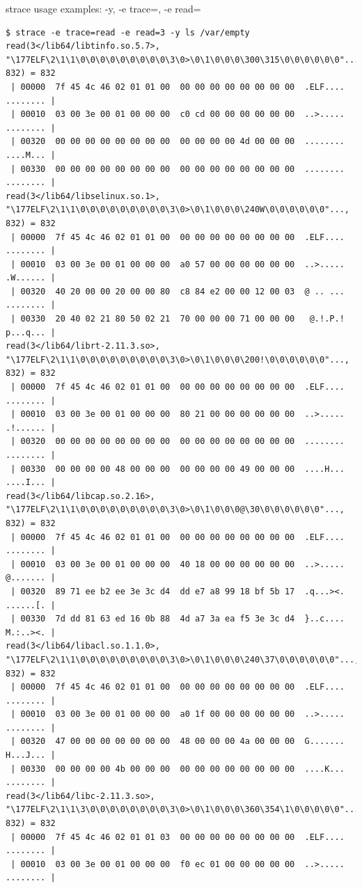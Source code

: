 \documentclass[unicode]{beamer}
\begin{document}
\begin{frame}[fragile]{strace usage examples: -y, -e trace=, -e read=}
\Tiny
\begin{verbatim}
$ strace -e trace=read -e read=3 -y ls /var/empty
read(3</lib64/libtinfo.so.5.7>, "\177ELF\2\1\1\0\0\0\0\0\0\0\0\0\3\0>\0\1\0\0\0\300\315\0\0\0\0\0\0"..., 832) = 832
 | 00000  7f 45 4c 46 02 01 01 00  00 00 00 00 00 00 00 00  .ELF.... ........ |
 | 00010  03 00 3e 00 01 00 00 00  c0 cd 00 00 00 00 00 00  ..>..... ........ |
 | 00320  00 00 00 00 00 00 00 00  00 00 00 00 4d 00 00 00  ........ ....M... |
 | 00330  00 00 00 00 00 00 00 00  00 00 00 00 00 00 00 00  ........ ........ |
read(3</lib64/libselinux.so.1>, "\177ELF\2\1\1\0\0\0\0\0\0\0\0\0\3\0>\0\1\0\0\0\240W\0\0\0\0\0\0"..., 832) = 832
 | 00000  7f 45 4c 46 02 01 01 00  00 00 00 00 00 00 00 00  .ELF.... ........ |
 | 00010  03 00 3e 00 01 00 00 00  a0 57 00 00 00 00 00 00  ..>..... .W...... |
 | 00320  40 20 00 00 20 00 00 80  c8 84 e2 00 00 12 00 03  @ .. ... ........ |
 | 00330  20 40 02 21 80 50 02 21  70 00 00 00 71 00 00 00   @.!.P.! p...q... |
read(3</lib64/librt-2.11.3.so>, "\177ELF\2\1\1\0\0\0\0\0\0\0\0\0\3\0>\0\1\0\0\0\200!\0\0\0\0\0\0"..., 832) = 832
 | 00000  7f 45 4c 46 02 01 01 00  00 00 00 00 00 00 00 00  .ELF.... ........ |
 | 00010  03 00 3e 00 01 00 00 00  80 21 00 00 00 00 00 00  ..>..... .!...... |
 | 00320  00 00 00 00 00 00 00 00  00 00 00 00 00 00 00 00  ........ ........ |
 | 00330  00 00 00 00 48 00 00 00  00 00 00 00 49 00 00 00  ....H... ....I... |
read(3</lib64/libcap.so.2.16>, "\177ELF\2\1\1\0\0\0\0\0\0\0\0\0\3\0>\0\1\0\0\0@\30\0\0\0\0\0\0"..., 832) = 832
 | 00000  7f 45 4c 46 02 01 01 00  00 00 00 00 00 00 00 00  .ELF.... ........ |
 | 00010  03 00 3e 00 01 00 00 00  40 18 00 00 00 00 00 00  ..>..... @....... |
 | 00320  89 71 ee b2 ee 3e 3c d4  dd e7 a8 99 18 bf 5b 17  .q...><. ......[. |
 | 00330  7d dd 81 63 ed 16 0b 88  4d a7 3a ea f5 3e 3c d4  }..c.... M.:..><. |
read(3</lib64/libacl.so.1.1.0>, "\177ELF\2\1\1\0\0\0\0\0\0\0\0\0\3\0>\0\1\0\0\0\240\37\0\0\0\0\0\0"..., 832) = 832
 | 00000  7f 45 4c 46 02 01 01 00  00 00 00 00 00 00 00 00  .ELF.... ........ |
 | 00010  03 00 3e 00 01 00 00 00  a0 1f 00 00 00 00 00 00  ..>..... ........ |
 | 00320  47 00 00 00 00 00 00 00  48 00 00 00 4a 00 00 00  G....... H...J... |
 | 00330  00 00 00 00 4b 00 00 00  00 00 00 00 00 00 00 00  ....K... ........ |
read(3</lib64/libc-2.11.3.so>, "\177ELF\2\1\1\3\0\0\0\0\0\0\0\0\3\0>\0\1\0\0\0\360\354\1\0\0\0\0\0"..., 832) = 832
 | 00000  7f 45 4c 46 02 01 01 03  00 00 00 00 00 00 00 00  .ELF.... ........ |
 | 00010  03 00 3e 00 01 00 00 00  f0 ec 01 00 00 00 00 00  ..>..... ........ |

\end{verbatim}
\end{frame}
\end{document}
